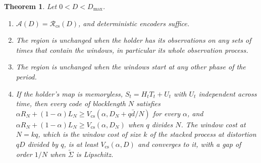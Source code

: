 \documentclass[11pt,onecolumn]{IEEEtran}
\newtheorem{theorem}{Theorem}
\newcommand{\tS}{\tilde\Sigma}
\begin{document}
\begin{theorem}\label{thm:cyclo}
Let $0<D<D_{\max}$.
\begin{enumerate}
\item[(a)] $\mathcal A(D)=\mathcal R_{\mathrm{cs}}(D)$, and deterministic
encoders suffice.
\item[(b)] The region is unchanged when the holder has its observations
on any sets of times that contain the windows, in particular its
whole observation process.
\item[(c)] The region is unchanged when the windows start at any other
phase of the period.
\item[(d)] If the holder's map is memoryless, $S_t=H_tT_t+U_t$ with
$U_t$ independent across time, then every code of blocklength $N$
satisfies
$\alpha R_N+(1-\alpha)L_N\ge V_{\mathrm{cs}}(\alpha,D_N+q\bar d/N)$ for
every $\alpha$, and $\alpha R_N+(1-\alpha)L_N\ge V_{\mathrm{cs}}(\alpha,D_N)$
when $q$ divides $N$. The window cost at $N=kq$, which is the window
cost of size $k$ of the stacked process at distortion $qD$ divided by
$q$, is at least $V_{\mathrm{cs}}(\alpha,D)$ and converges to it, with a
gap of order $1/N$ when $\tS$ is Lipschitz.
\end{enumerate}
\end{theorem}
\end{document}
